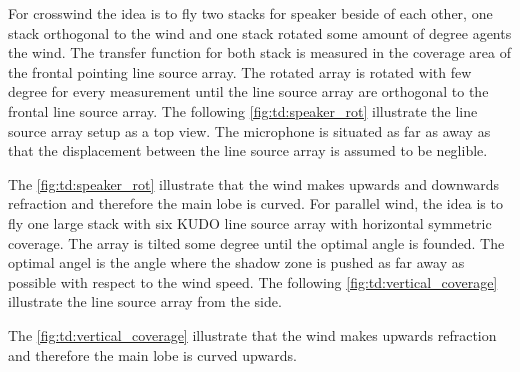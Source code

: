 For crosswind the idea is to fly two stacks for speaker beside of each other, one stack orthogonal to the wind and one stack rotated some amount of degree agents the wind. The transfer function for both stack is measured in the coverage area of the frontal pointing line source array. The rotated array is rotated with few degree for every measurement until the line source array are orthogonal to the frontal line source array. The following \autoref{fig:td:speaker_rot} illustrate the line source array setup as a top view. The microphone is situated as far as away as that the displacement between the line source array is assumed to be neglible.


The \autoref{fig:td:speaker_rot} illustrate that the wind makes upwards and downwards refraction and therefore the main lobe is curved. For parallel wind, the idea is to fly one large stack with six KUDO line source array with horizontal symmetric coverage. The array is tilted some degree until the optimal angle is founded. The optimal angel is the angle where the shadow zone is pushed as far away as possible with respect to the wind speed. The following \autoref{fig:td:vertical_coverage} illustrate the line source array from the side.

   

The \autoref{fig:td:vertical_coverage} illustrate that the wind makes upwards refraction and therefore the main lobe is curved upwards.


